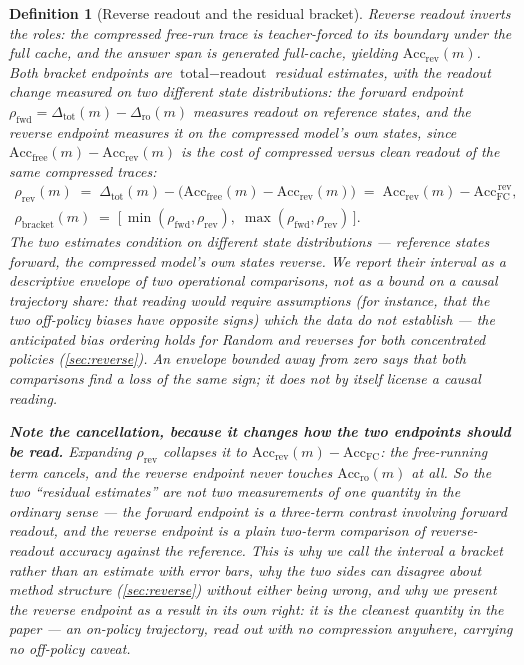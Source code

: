 \documentclass{article}
\newtheorem{definition}{Definition}
\newcommand{\accfc}{\mathrm{Acc}_{\mathrm{FC}}}
\newcommand{\accfree}[1]{\mathrm{Acc}_{\mathrm{free}}(#1)}
\newcommand{\accro}[1]{\mathrm{Acc}_{\mathrm{ro}}(#1)}
\newcommand{\accrev}[1]{\mathrm{Acc}_{\mathrm{rev}}(#1)}
\newcommand{\dtot}[1]{\Delta_{\mathrm{tot}}(#1)}
\newcommand{\dro}[1]{\Delta_{\mathrm{ro}}(#1)}
\begin{document}
\begin{definition}[Reverse readout and the residual bracket]
Reverse readout inverts the roles: the \emph{compressed free-run} trace is teacher-forced to its boundary under the \emph{full} cache, and the answer span is generated full-cache, yielding $\accrev{m}$. Both bracket endpoints are $\text{total} - \text{readout}$ residual estimates, with the readout change measured on two different state distributions: the forward endpoint $\rho_{\mathrm{fwd}} = \dtot{m} - \dro{m}$ measures readout on \emph{reference} states, and the reverse endpoint measures it on the compressed model's \emph{own} states, since $\accfree{m} - \accrev{m}$ is the cost of compressed versus clean readout of the same compressed traces:
\begin{gather}
\rho_{\mathrm{rev}}(m) \;=\; \dtot{m} - \bigl(\accfree{m} - \accrev{m}\bigr) \;=\; \accrev{m} - \accfc^{\,\mathrm{rev}} ,\\
\rho_{\mathrm{bracket}}(m) \;=\; \bigl[\, \min(\rho_{\mathrm{fwd}}, \rho_{\mathrm{rev}}),\; \max(\rho_{\mathrm{fwd}}, \rho_{\mathrm{rev}}) \,\bigr].
\end{gather}
The two estimates condition on different state distributions --- reference states forward, the compressed model's own states reverse. We report their interval as a descriptive envelope of two operational comparisons, not as a bound on a causal trajectory share: that reading would require assumptions (for instance, that the two off-policy biases have opposite signs) which the data do not establish --- the anticipated bias ordering holds for Random and reverses for both concentrated policies (\cref{sec:reverse}). An envelope bounded away from zero says that both comparisons find a loss of the same sign; it does not by itself license a causal reading.

\textbf{Note the cancellation, because it changes how the two endpoints should be read.} Expanding $\rho_{\mathrm{rev}}$ collapses it to $\accrev{m} - \accfc$: the free-running term cancels, and \emph{the reverse endpoint never touches $\accro{m}$ at all}. So the two ``residual estimates'' are not two measurements of one quantity in the ordinary sense --- the forward endpoint is a three-term contrast involving forward readout, and the reverse endpoint is a plain two-term comparison of reverse-readout accuracy against the reference. This is why we call the interval a bracket rather than an estimate with error bars, why the two sides can disagree about method structure (\cref{sec:reverse}) without either being wrong, and why we present the reverse endpoint as a result in its own right: it is the cleanest quantity in the paper --- an on-policy trajectory, read out with no compression anywhere, carrying no off-policy caveat.
\end{definition}
\end{document}
